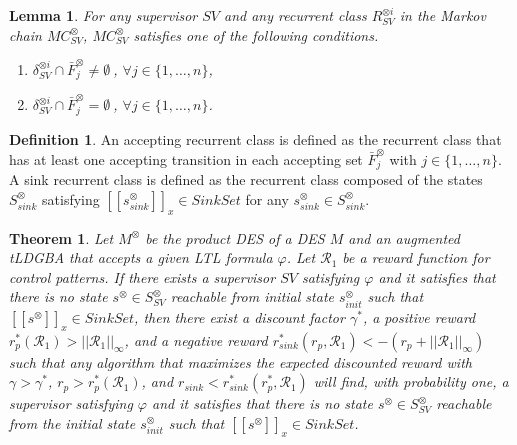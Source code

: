 \documentclass[10pt]{article}
\newtheorem{theorem}{Theorem}
\newtheorem{lemma}{Lemma}
\theoremstyle{definition}
\newtheorem{definition}{Definition}
\newcommand{\myspq}{\ensuremath{[\![s^{\otimes}]\!]}_x}
\newcommand{\myspqsink}{\ensuremath{[\![s^{\otimes}_{sink}]\!]}_x}
\begin{document}
\begin{lemma}
  For any supervisor $SV$ and any recurrent class $R^{\otimes i}_{SV}$ in the Markov chain $MC^{\otimes}_{SV}$,
  $MC^{\otimes}_{SV}$ satisfies one of the following conditions.
  \vspace{2mm}
  \begin{enumerate}
    \item $\delta^{\otimes i}_{SV} \cap \bar{F}^{\otimes}_j \neq \emptyset\ $, $ \forall j \in \{ 1, \ldots ,n \}$,
    \item $\delta^{\otimes i}_{SV} \cap \bar{F}^{\otimes}_j = \emptyset\ $, $ \forall j \in \{ 1, \ldots ,n \}$.
  \end{enumerate}
  \label{lemma3-1}
\end{lemma}

\begin{definition}
  An accepting recurrent class is defined as the recurrent class that has at least one accepting transition in each accepting set $\bar{F}^{\otimes}_j$ with $j \in \{ 1, \ldots, n \}$. A sink recurrent class is defined as the recurrent class composed of the states $S^{\otimes}_{sink}$ satisfying $\myspqsink \in SinkSet$ for any $s^{\otimes}_{sink} \in S^{\otimes}_{sink}$.
\end{definition}

\begin{theorem}
  Let $M^{\otimes}$ be the product DES of a DES $M$ and an augmented tLDGBA that accepts a given LTL formula $\varphi$. Let $\mathcal{R}_1$ be a reward function for control patterns.
  If there exists a supervisor $SV$ satisfying $\varphi$ and it satisfies that there is no state $s^{\otimes} \in S^{\otimes}_{SV}$ reachable from initial state $s^{\otimes}_{init}$ such that $\myspq \in SinkSet$, then there exist a discount factor $\gamma^{\ast}$, a positive reward $r^{\ast}_p(\mathcal{R}_1) > ||\mathcal{R}_1||_{\infty}$, and a negative reward $r^{\ast}_{sink}(r_p, \mathcal{R}_1) < - (r_p + ||\mathcal{R}_1||_{\infty}) $ such that any algorithm that maximizes the expected discounted reward with $\gamma > \gamma^{\ast}$, $r_p > r^{\ast}_p(\mathcal{R}_1)$, and $r_{sink} < r^{\ast}_{sink}(r^{\ast}_p, \mathcal{R}_1)$ will find, with probability one, a supervisor satisfying $\varphi$ and it satisfies that there is no state $s^{\otimes} \in S^{\otimes}_{SV}$ reachable from the initial state $s^{\otimes}_{init}$ such that $\myspq \in SinkSet$.
\end{theorem}
\end{document}

